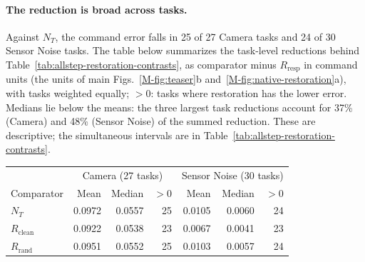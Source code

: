 \paragraph{The reduction is broad across tasks.}
Against $N_T$, the command error falls in 25 of 27 Camera tasks and 24 of 30 Sensor Noise tasks. The table below summarizes the task-level reductions behind Table~\ref{tab:allstep-restoration-contrasts}, as comparator minus $R_{\mathrm{resp}}$ in command units (the units of main Figs.~\ref*{M-fig:teaser}b and~\ref*{M-fig:native-restoration}a), with tasks weighted equally; $>0$: tasks where restoration has the lower error. Medians lie below the means: the three largest task reductions account for 37\% (Camera) and 48\% (Sensor Noise) of the summed reduction. These are descriptive; the simultaneous intervals are in Table~\ref{tab:allstep-restoration-contrasts}.

\begin{center}
\small
\setlength{\tabcolsep}{3pt}
\begin{tabular}{@{}lrrrrrr@{}}
\toprule
 & \multicolumn{3}{c}{Camera (27 tasks)} & \multicolumn{3}{c}{Sensor Noise (30 tasks)}\\
Comparator & Mean & Median & $>0$ & Mean & Median & $>0$\\
\midrule
$N_T$ & 0.0972 & 0.0557 & 25 & 0.0105 & 0.0060 & 24\\
$R_{\mathrm{clean}}$ & 0.0922 & 0.0538 & 23 & 0.0067 & 0.0041 & 23\\
$R_{\mathrm{rand}}$ & 0.0951 & 0.0552 & 25 & 0.0103 & 0.0057 & 24\\
\bottomrule
\end{tabular}
\end{center}
